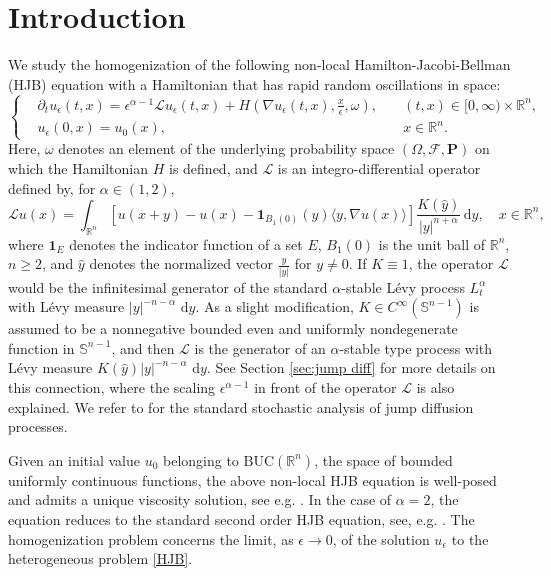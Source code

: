 \documentclass[11pt,reqno]{amsart}
\theoremstyle{definition}
\theoremstyle{remark}
\numberwithin{equation}{section}
\def\BUC{\mathrm{BUC}}
\def\bP{\mathbf{P}}
\newcommand{\eps}{\epsilon}
\newcommand{\scrL}{\mathscr{L}}
\newcommand{\R}{{\mathbb{R}}}
\begin{document}
\section{Introduction}

We study the homogenization of the following non-local Hamilton-Jacobi-Bellman (HJB) equation with a Hamiltonian that has rapid random oscillations in space:
\begin{equation}\label{HJB}
     \left\{
   \begin{aligned}
   & \partial_t u_{\epsilon}(t,x) = \epsilon^{\alpha-1}  \mathscr{L}u_{\epsilon}(t,x) + H\left(\nabla u_{\epsilon}(t,x), \frac{x}{\epsilon}, \omega\right),\quad & (t,x) \in [0,\infty)\times\mathbb{R}^n, \\
   &  u_{\epsilon}(0,x) = u_{0}(x), \quad & x\in \mathbb{R}^n.
   \end{aligned}
   \right.
\end{equation}
Here, $\omega$ denotes an element of the underlying probability space $(\Omega, \mathscr{F}, \bP)$ on which the Hamiltonian $H$ is defined, and $\mathscr{L}$ is an integro-differential operator defined by, for $\alpha \in (1,2)$,
\begin{equation}\label{eq:diL}
    \mathscr{L} u(x) = \int_{\mathbb{R}^{n}} [u(x+y)-u(x)-\mathbf{1}_{B_{1}(0)}(y)\langle y, \nabla u(x)\rangle ]\frac{K(\hat{y})}{|y|^{n+\alpha}}\,\mathrm{d}y,\quad x\in\mathbb{R}^n,
\end{equation}
where $\mathbf{1}_E$ denotes the indicator function of a set $E$, ${B_{1}(0)}$ is the unit ball of $\R^n$, $n\ge 2$, and $\hat{y}$ denotes the normalized vector $\frac{y}{|y|}$ for $y\ne 0$. If $K\equiv 1$, the operator $\mathscr{L}$ would be the infinitesimal generator of the standard $\alpha$-stable L\'{e}vy process $L^{\alpha}_t$ with L\'evy measure $|y|^{-n-\alpha}\,\,\mathrm{d}y$. As a slight modification, 
$K\in C^\infty(\mathbb{S}^{n-1})$ is assumed to be a nonnegative bounded even and uniformly nondegenerate function in $\mathbb{S}^{n-1}$, and then $\mathcal{L}$ is the generator of an $\alpha$-stable type process with L\'evy measure $K(\hat{y})|y|^{-n-\alpha}\,\,\mathrm{d}y$. See Section \ref{sec:jump diff} for more details on this connection, where the scaling $\eps^{\alpha-1}$ in front of the operator $\scrL$ is also explained. We refer to \cite{A2004} for the standard stochastic analysis of jump diffusion processes. 

Given an initial value $u_{0}$ belonging to $\BUC(\mathbb{R}^n)$, the space of bounded uniformly continuous functions, the above non-local HJB equation is well-posed and admits a unique viscosity solution, see e.g. \cite{GB97, HP98}. In the case of $\alpha = 2$, the equation reduces to the standard second order HJB equation, see, e.g. \cite{HP09}. The homogenization problem concerns the limit, as $\eps\to 0$, of the solution $u_\eps$ to the heterogeneous problem \eqref{HJB}.
\end{document}
